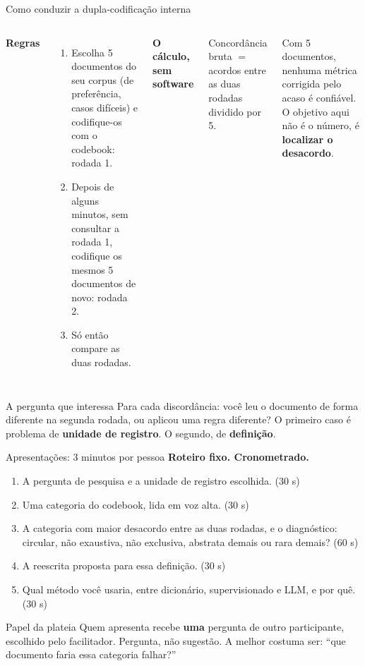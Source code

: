 \documentclass[11pt,aspectratio=169]{beamer}
\begin{document}
\begin{frame}{Como conduzir a dupla-codificação interna}
\begin{columns}[T]
\textbf{Regras}
\begin{enumerate}\small
  \item Escolha 5 documentos do seu corpus (de preferência, casos difíceis) e
        codifique-os com o codebook: rodada 1.
  \item Depois de alguns minutos, sem consultar a rodada 1, codifique os
        mesmos 5 documentos de novo: rodada 2.
  \item Só então compare as duas rodadas.
\end{enumerate}
\textbf{O cálculo, sem software}
\vspace{0.1cm}

\small Concordância bruta $=$ acordos entre as duas rodadas dividido por 5.
\vspace{0.15cm}

Com 5 documentos, nenhuma métrica corrigida pelo acaso é confiável. O objetivo
aqui não é o número, é \textbf{localizar o desacordo}.
\end{columns}
\vspace{0.25cm}
\begin{alertblock}{A pergunta que interessa}
\small
Para cada discordância: você leu o documento de forma diferente na segunda
rodada, ou aplicou uma regra diferente? O primeiro caso é problema de
\textbf{unidade de registro}. O segundo, de \textbf{definição}.
\end{alertblock}
\end{frame}

\begin{frame}{Apresentações: 3 minutos por pessoa}
\textbf{Roteiro fixo. Cronometrado.}
\vspace{0.25cm}
\begin{enumerate}\small
  \item A pergunta de pesquisa e a unidade de registro escolhida. \hfill (30 s)
  \item Uma categoria do codebook, lida em voz alta. \hfill (30 s)
  \item A categoria com maior desacordo entre as duas rodadas, e o
        diagnóstico: circular, não exaustiva, não exclusiva, abstrata demais
        ou rara demais? \hfill (60 s)
  \item A reescrita proposta para essa definição. \hfill (30 s)
  \item Qual método você usaria, entre dicionário, supervisionado e LLM, e por
        quê. \hfill (30 s)
\end{enumerate}
\vspace{0.25cm}
\begin{block}{Papel da plateia}
\small
Quem apresenta recebe \textbf{uma} pergunta de outro participante, escolhido
pelo facilitador. Pergunta, não sugestão. A melhor costuma ser: ``que
documento faria essa categoria falhar?''
\end{block}
\end{frame}
\end{document}
